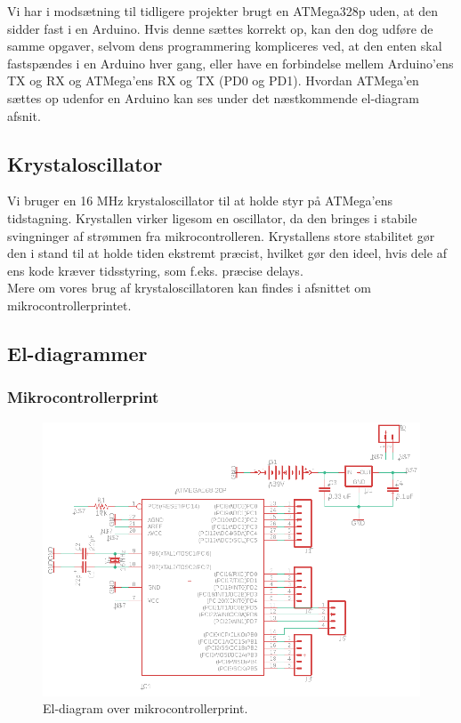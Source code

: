 Vi har i modsætning til tidligere projekter brugt en ATMega328p uden, at den sidder fast i en Arduino. Hvis denne sættes korrekt op, kan den dog udføre de samme opgaver, selvom dens programmering kompliceres ved, at den enten skal fastspændes i en Arduino hver gang, eller have en forbindelse mellem Arduino’ens TX og RX og ATMega’ens RX og TX (PD0 og PD1). Hvordan ATMega’en sættes op udenfor en Arduino kan ses under det næstkommende el-diagram afsnit.



\subsection{Krystaloscillator}
Vi bruger en 16 MHz krystaloscillator til at holde styr på ATMega’ens tidstagning. Krystallen virker ligesom en oscillator, da den bringes i stabile svingninger af strømmen fra mikrocontrolleren. Krystallens store stabilitet gør den i stand til at holde tiden ekstremt præcist, hvilket gør den ideel, hvis dele af ens kode kræver tidsstyring, som f.eks. præcise delays. \\

Mere om vores brug af krystaloscillatoren kan findes i afsnittet om mikrocontrollerprintet.

\subsection{El-diagrammer}
\subsubsection{Mikrocontrollerprint}

\begin{figure}[H]
\centering
\includegraphics[scale=0.8, angle=90]{Billeder/El-diagram.PNG}
\caption{El-diagram over mikrocontrollerprint.}
\label{fig:El_diagram_mikro}
\end{figure}

